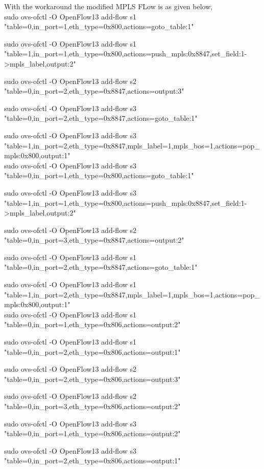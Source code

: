 With the workaround the modified MPLS FLow is as given below,\\

sudo ovs-ofctl -O OpenFlow13 add-flow s1 "table=0,in_port=1,eth_type=0x800,actions=goto_table:1" 

sudo ovs-ofctl -O OpenFlow13 add-flow s1 "table=1,in_port=1,eth_type=0x800,actions=push_mpls:0x8847,set_field:1->mpls_label,output:2" 

sudo ovs-ofctl -O OpenFlow13 add-flow s2 "table=0,in_port=2,eth_type=0x8847,actions=output:3" 

sudo ovs-ofctl -O OpenFlow13 add-flow s3 "table=0,in_port=2,eth_type=0x8847,actions=goto_table:1" 

sudo ovs-ofctl -O OpenFlow13 add-flow s3 "table=1,in_port=2,eth_type=0x8847,mpls_label=1,mpls_bos=1,actions=pop_mpls:0x800,output:1" \\

 

sudo ovs-ofctl -O OpenFlow13 add-flow s3 "table=0,in_port=1,eth_type=0x800,actions=goto_table:1" 

sudo ovs-ofctl -O OpenFlow13 add-flow s3 "table=1,in_port=1,eth_type=0x800,actions=push_mpls:0x8847,set_field:1->mpls_label,output:2" 

sudo ovs-ofctl -O OpenFlow13 add-flow s2 "table=0,in_port=3,eth_type=0x8847,actions=output:2" 

sudo ovs-ofctl -O OpenFlow13 add-flow s1 "table=0,in_port=2,eth_type=0x8847,actions=goto_table:1" 

sudo ovs-ofctl -O OpenFlow13 add-flow s1 "table=1,in_port=2,eth_type=0x8847,mpls_label=1,mpls_bos=1,actions=pop_mpls:0x800,output:1" \\

 

sudo ovs-ofctl -O OpenFlow13 add-flow s1 "table=0,in_port=1,eth_type=0x806,actions=output:2" 

sudo ovs-ofctl -O OpenFlow13 add-flow s1 "table=0,in_port=2,eth_type=0x806,actions=output:1" 

sudo ovs-ofctl -O OpenFlow13 add-flow s2 "table=0,in_port=2,eth_type=0x806,actions=output:3" 

sudo ovs-ofctl -O OpenFlow13 add-flow s2 "table=0,in_port=3,eth_type=0x806,actions=output:2" 

sudo ovs-ofctl -O OpenFlow13 add-flow s3 "table=0,in_port=1,eth_type=0x806,actions=output:2" 

sudo ovs-ofctl -O OpenFlow13 add-flow s3 "table=0,in_port=2,eth_type=0x806,actions=output:1" 

